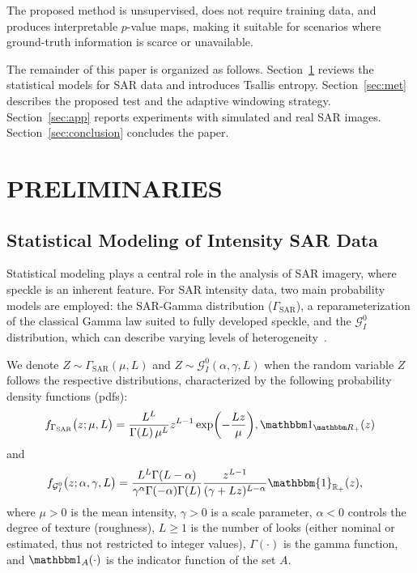 \documentclass[
  lettersize  journal,
]{IEEEtran}%
\begin{document}
The proposed method is unsupervised, does not require training data, and
produces interpretable \(p\)-value maps, making it suitable for
scenarios where ground-truth information is scarce or unavailable.

The remainder of this paper is organized as follows.
Section~\ref{sec:pre} reviews the statistical models for SAR data and
introduces Tsallis entropy. Section~\ref{sec:met} describes the proposed
test and the adaptive windowing strategy. Section~\ref{sec:app} reports
experiments with simulated and real SAR images.
Section~\ref{sec:conclusion} concludes the paper.

\section{PRELIMINARIES}\label{sec:pre}

\subsection{Statistical Modeling of Intensity SAR
Data}\label{statistical-modeling-of-intensity-sar-data}

Statistical modeling plays a central role in the analysis of SAR
imagery, where speckle is an inherent feature. For SAR intensity data,
two main probability models are employed: the SAR-Gamma distribution
(\(\Gamma_{\text{SAR}}\)), a reparameterization of the classical Gamma
law suited to fully developed speckle, and the \(\mathcal{G}^0_I\)
distribution, which can describe varying levels of
heterogeneity~.

We denote \(Z \sim \Gamma_{\mathrm{SAR}}(\mu, L)\) and
\(Z \sim \mathcal{G}_I^0(\alpha, \gamma, L)\) when the random variable
\(Z\) follows the respective distributions, characterized by the
following probability density functions (pdfs): \begin{equation}
    f_{\Gamma_{\text{SAR}}}\bigl(z;\mu, L\bigr) 
    = \frac{L^L}{\Gamma(L)\,\mu^L} z^{L-1} 
    \exp \biggl(-\frac{Lz}{\mu}\biggr),
    \mathbbm 1_{\mathbbm R_+}(z) \label{E:gamma1}
\end{equation} and \begin{align}
 f_{\mathcal{G}^0_I}\bigl(z;  \alpha,\gamma, L \bigr) &=\frac{L^L\Gamma(L-\alpha)}{\gamma^{\alpha}\Gamma(-\alpha)\Gamma(L)}\frac{z^{L-1}}{(\gamma+Lz)^{L-\alpha}} \mathbbm{1}_{\mathbb{R}_+}(z), \label{E:gi01}
\end{align} where \(\mu > 0\) is the mean intensity, \(\gamma > 0\) is a
scale parameter, \(\alpha < 0\) controls the degree of texture
(roughness), \(L \geq 1\) is the number of looks (either nominal or
estimated, thus not restricted to integer values), \(\Gamma(\cdot)\) is
the gamma function, and \(\mathbbm 1_{A}(\cdot)\) is the indicator
function of the set \(A\).
\end{document}
